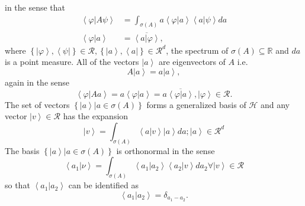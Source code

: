 \documentclass[aps,preprint]{revtex4}%
\begin{document}
in the sense that
\begin{align}
\left\langle \varphi\left\vert A\psi\right.  \right\rangle  &  =\int%
_{\sigma\left(  A\right)  }a\left\langle \left.  \varphi\right\vert
a\right\rangle \left\langle \left.  a\right\vert \psi\right\rangle da\\
\left\langle \left.  \varphi\right\vert a\right\rangle  &  =\overline
{\left\langle \left.  a\right\vert \varphi\right\rangle },
\end{align}
where $\left\{  \left\vert \varphi\right\rangle ,\left\langle \psi\right\vert
\right\}  \in\mathcal{R},\left\{  \left\vert a\right\rangle ,\left\langle
a\right\vert \right\}  \in\mathcal{R}^{d}$, the spectrum of $\sigma\left(
A\right)  \subseteq\mathbb{R}$ and $da$ is a point measure. All of the vectors
$\left\vert a\right\rangle $ are eigenvectors of $A$ i.e.
\begin{equation}
A\left\vert a\right\rangle =a\left\vert a\right\rangle ,
\end{equation}
again in the sense%
\begin{equation}
\left\langle \varphi\left\vert Aa\right.  \right\rangle =a\left\langle
\varphi\left\vert a\right.  \right\rangle =a\overline{\left\langle
\varphi\left\vert a\right.  \right\rangle },\left\vert \varphi\right\rangle
\in\mathcal{R}.
\end{equation}
The set of vectors $\left\{  \left.  \left\vert a\right\rangle \right\vert
a\in\sigma\left(  A\right)  \right\}  $ forms a generalized basis of
$\mathcal{H}$ and any vector $\left\vert v\right\rangle \in\mathcal{R}$ has
the expansion
\begin{equation}
\left\vert v\right\rangle =\int_{\sigma\left(  A\right)  }\left\langle \left.
a\right\vert v\right\rangle \left\vert a\right\rangle da;\left\vert
a\right\rangle \in\mathcal{R}^{d}%
\end{equation}
The basis $\left\{  \left.  \left\vert a\right\rangle \right\vert a\in
\sigma\left(  A\right)  \right\}  $ is orthonormal in the sense
\begin{equation}
\left\langle \left.  a_{1}\right\vert \nu\right\rangle =\int_{\sigma\left(
A\right)  }\left\langle \left.  a_{1}\right\vert a_{2}\right\rangle
\left\langle \left.  a_{2}\right\vert v\right\rangle da_{2}\forall\left\vert
v\right\rangle \in\mathcal{R}%
\end{equation}
so that $\left\langle \left.  a_{1}\right\vert a_{2}\right\rangle $ can be
identified as
\begin{equation}
\left\langle \left.  a_{1}\right\vert a_{2}\right\rangle =\delta_{a_{1}-a_{2}%
}.
\end{equation}
\end{document}
